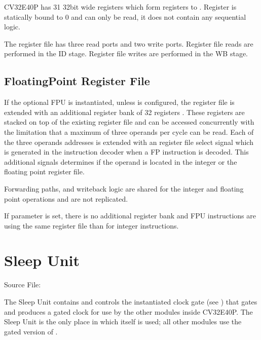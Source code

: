 \documentclass[letterpaper,10pt,english]{sphinxmanual}
\begin{document}
\sphinxAtStartPar
CV32E40P has 31 32\sphinxhyphen{}bit wide registers which form registers  to .
Register  is statically bound to 0 and can only be read, it does not
contain any sequential logic.

\sphinxAtStartPar
The register file has three read ports and two write ports. Register file reads are performed in the ID stage.
Register file writes are performed in the WB stage.


\section{Floating\sphinxhyphen{}Point Register File}
\label{\detokenize{register_file:floating-point-register-file}}
\sphinxAtStartPar
If the optional FPU is instantiated, unless  is configured, the register file is extended
with an additional register bank of 32 registers \sphinxhyphen{}. These registers
are stacked on top of the existing register file and can be accessed
concurrently with the limitation that a maximum of three operands per
cycle can be read. Each of the three operands addresses is extended with
an register file select signal which is generated in the instruction decoder
when a FP instruction is decoded. This additional signals determines if
the operand is located in the integer or the floating point register
file.

\sphinxAtStartPar
Forwarding paths, and write\sphinxhyphen{}back logic are shared for the integer and
floating point operations and are not replicated.

\sphinxAtStartPar
If  parameter is set, there is no additional register bank and FPU instructions are using
the same register file than for integer instructions.

\sphinxstepscope


\chapter{Sleep Unit}
\label{\detokenize{sleep:sleep-unit}}\label{\detokenize{sleep:id1}}\label{\detokenize{sleep::doc}}
\sphinxAtStartPar
Source File: 

\sphinxAtStartPar
The Sleep Unit contains and controls the instantiated clock gate (see {\hyperref[\detokenize{integration:clock-gating-cell}]{}}) that gates  and produces a gated clock
for use by the other modules inside CV32E40P. The Sleep Unit is the only place in which  itself is used; all other modules use the gated version of .
\end{document}
